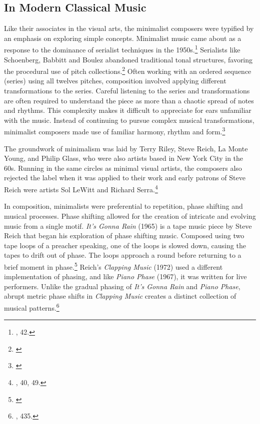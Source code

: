 \documentclass[12pt,twoside]{reedthesis}
\begin{document}
\subsection{In Modern Classical Music}
Like their associates in the visual arts, the minimalist composers were typified by an emphasis on exploring simple concepts. Minimalist music came about as a response to the dominance of serialist techniques in the 1950s.\footnote{\cite{obendorfMinimalismDesigningSimplicity2009}, 42.} Serialists like Schoenberg, Babbitt and Boulez abandoned traditional tonal structures, favoring the procedural use of pitch collections.\footnote{\cite{Serialism}} Often working with an ordered sequence (series) using all twelves pitches, composition involved applying different transformations to the series. Careful listening to the series and transformations are often required to understand the piece as more than a chaotic spread of notes and rhythms. This complexity makes it difficult to appreciate for ears unfamiliar with the music. Instead of continuing to pursue complex musical transformations, minimalist composers made use of familiar harmony, rhythm and form.\footnote{\cite{potterMinimalismUSA2019}}

The groundwork of minimalism was laid by Terry Riley, Steve Reich, La Monte Young, and Philip Glass, who were also artists based in New York City in the 60s. Running in the same circles as minimal visual artists, the composers also rejected the label when it was applied to their work and early patrons of Steve Reich were artists Sol LeWitt and Richard Serra.\footnote{\cite{obendorfMinimalismDesigningSimplicity2009}, 40, 49.}

In composition, minimalists were preferential to repetition, phase shifting and musical processes. Phase shifting allowed for the creation of intricate and evolving music from a single motif. \emph{It's Gonna Rain} (1965) is a tape music piece by Steve Reich that began his exploration of phase shifting music. Composed using two tape loops of a preacher speaking, one of the loops is slowed down, causing the tapes to drift out of phase. The loops approach a round before returning to a brief moment in phase.\footnote{\cite{huizengaFiftyYearsSteve2015}} Reich's \emph{Clapping Music} (1972) used a different implementation of phasing, and like \emph{Piano Phase} (1967), it was written for live performers. Unlike the gradual phasing of \emph{It's Gonna Rain} and \emph{Piano Phase}, abrupt metric phase shifts in \emph{Clapping Music} creates a distinct collection of musical patterns.\footnote{\cite{morganAnthologyTwentiethCenturyMusic1992}, 435.}
\end{document}

